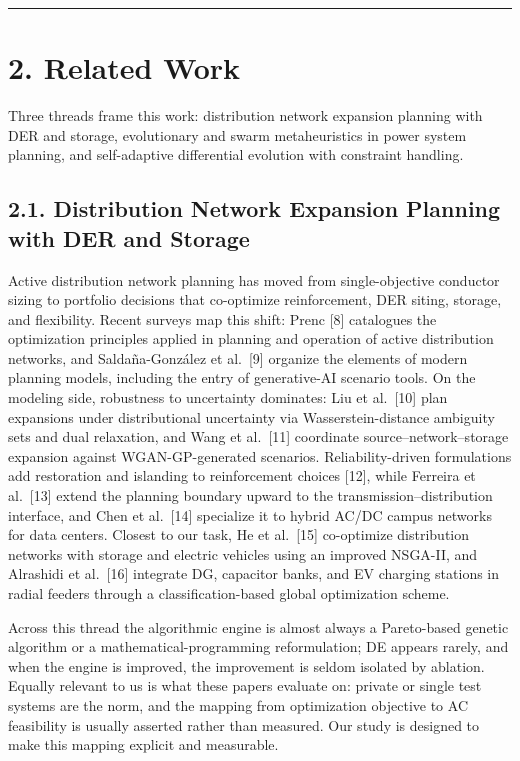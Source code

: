 \documentclass[
  10pt,
  a4paper,
]{article}
\begin{document}
\begin{center}\rule{0.5\linewidth}{0.5pt}\end{center}

\section{2. Related Work}\label{related-work}

Three threads frame this work: distribution network expansion planning
with DER and storage, evolutionary and swarm metaheuristics in power
system planning, and self-adaptive differential evolution with
constraint handling.

\subsection{2.1. Distribution Network Expansion Planning with DER and
Storage}\label{distribution-network-expansion-planning-with-der-and-storage}

Active distribution network planning has moved from single-objective
conductor sizing to portfolio decisions that co-optimize reinforcement,
DER siting, storage, and flexibility. Recent surveys map this shift:
Prenc {[}8{]} catalogues the optimization principles applied in planning
and operation of active distribution networks, and Saldaña-González et
al.~{[}9{]} organize the elements of modern planning models, including
the entry of generative-AI scenario tools. On the modeling side,
robustness to uncertainty dominates: Liu et al.~{[}10{]} plan expansions
under distributional uncertainty via Wasserstein-distance ambiguity sets
and dual relaxation, and Wang et al.~{[}11{]} coordinate
source--network--storage expansion against WGAN-GP-generated scenarios.
Reliability-driven formulations add restoration and islanding to
reinforcement choices {[}12{]}, while Ferreira et al.~{[}13{]} extend
the planning boundary upward to the transmission--distribution
interface, and Chen et al.~{[}14{]} specialize it to hybrid AC/DC campus
networks for data centers. Closest to our task, He et al.~{[}15{]}
co-optimize distribution networks with storage and electric vehicles
using an improved NSGA-II, and Alrashidi et al.~{[}16{]} integrate DG,
capacitor banks, and EV charging stations in radial feeders through a
classification-based global optimization scheme.

Across this thread the algorithmic engine is almost always a
Pareto-based genetic algorithm or a mathematical-programming
reformulation; DE appears rarely, and when the engine is improved, the
improvement is seldom isolated by ablation. Equally relevant to us is
what these papers evaluate on: private or single test systems are the
norm, and the mapping from optimization objective to AC feasibility is
usually asserted rather than measured. Our study is designed to make
this mapping explicit and measurable.
\end{document}
